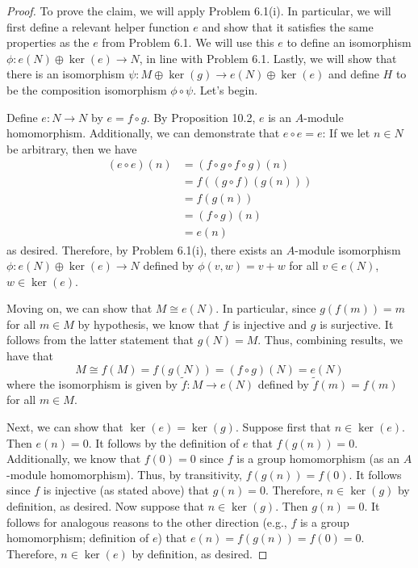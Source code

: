 \documentclass[../psets.tex]{subfiles}
\begin{document}
\begin{enumerate}
\begin{proof}
        To prove the claim, we will apply Problem 6.1(i). In particular, we will first define a relevant helper function $e$ and show that it satisfies the same properties as the $e$ from Problem 6.1. We will use this $e$ to define an isomorphism $\phi:e(N)\oplus\ker(e)\to N$, in line with Problem 6.1. Lastly, we will show that there is an isomorphism $\psi:M\oplus\ker(g)\to e(N)\oplus\ker(e)$ and define $H$ to be the composition isomorphism $\phi\circ\psi$. Let's begin.\par\smallskip
        Define $e:N\to N$ by $e=f\circ g$. By Proposition 10.2, $e$ is an $A$-module homomorphism. Additionally, we can demonstrate that $e\circ e=e$: If we let $n\in N$ be arbitrary, then we have
        \begin{align*}
            (e\circ e)(n) &= (f\circ g\circ f\circ g)(n)\\
            &= f((g\circ f)(g(n)))\\
            &= f(g(n))\\
            &= (f\circ g)(n)\\
            &= e(n)
        \end{align*}
        as desired. Therefore, by Problem 6.1(i), there exists an $A$-module isomorphism $\phi:e(N)\oplus\ker(e)\to N$ defined by $\phi(v,w)=v+w$ for all $v\in e(N)$, $w\in\ker(e)$.\par
        Moving on, we can show that $M\cong e(N)$. In particular, since $g(f(m))=m$ for all $m\in M$ by hypothesis, we know that $f$ is injective and $g$ is surjective. It follows from the latter statement that $g(N)=M$. Thus, combining results, we have that
        \begin{equation*}
            M \cong f(M)
            = f(g(N))
            = (f\circ g)(N)
            = e(N)
        \end{equation*}
        where the isomorphism is given by $\tilde{f}:M\to e(N)$ defined by $\tilde{f}(m)=f(m)$ for all $m\in M$.\par
        Next, we can show that $\ker(e)=\ker(g)$. Suppose first that $n\in\ker(e)$. Then $e(n)=0$. It follows by the definition of $e$ that $f(g(n))=0$. Additionally, we know that $f(0)=0$ since $f$ is a group homomorphism (as an $A$-module homomorphism). Thus, by transitivity, $f(g(n))=f(0)$. It follows since $f$ is injective (as stated above) that $g(n)=0$. Therefore, $n\in\ker(g)$ by definition, as desired. Now suppose that $n\in\ker(g)$. Then $g(n)=0$. It follows for analogous reasons to the other direction (e.g., $f$ is a group homomorphism; definition of $e$) that $e(n)=f(g(n))=f(0)=0$. Therefore, $n\in\ker(e)$ by definition, as desired.\par

\end{proof}
\end{enumerate}
\end{document}
